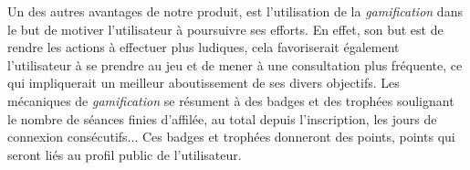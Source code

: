 Un des autres avantages de notre produit, est l'utilisation de la \textit{gamification} dans le but de motiver l'utilisateur à poursuivre ses efforts. En effet, son but est de rendre les actions à effectuer plus ludiques, cela favoriserait également l'utilisateur à se prendre au jeu et de mener à une consultation plus fréquente, ce qui impliquerait un meilleur aboutissement de ses divers objectifs. Les mécaniques de \textit{gamification} se résument à des badges et des trophées soulignant le nombre de séances finies d'affilée, au total depuis l'inscription, les jours de connexion consécutifs... Ces badges et trophées donneront des points, points qui seront liés au profil public de l'utilisateur.